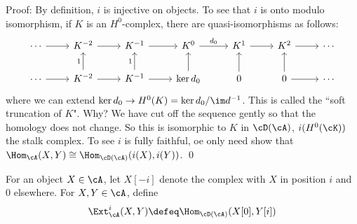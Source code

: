 \noindent Proof: By definition, $i$ is injective on objects. To see that $i$ is onto modulo isomorphism, if $K$ is an $H^0$-complex, there are quasi-isomorphisms as follows:
\[
\begin{tikzcd}
\cdots \arrow{r} & K^{-2} \arrow{r} & K^{-1} \arrow{r} & K^0 \arrow{r}{d_0} & K^1 \arrow{r} & K^2 \arrow{r} & \cdots \\
\cdots \arrow{r} & K^{-2} \arrow{r} \arrow{u}{1} & K^{-1} \arrow{r} \arrow{u}{1} & \ker d_0 \arrow{u} & 0 \arrow{u} & 0 \arrow{r} \arrow{u} & \cdots 
\end{tikzcd}
\]
where we can extend $\ker d_0 \to H^0(K)=\ker d_0/\im d^{-1}$. This is called the ``soft truncation of $K$". Why? We have cut off the sequence gently so that the homology does not change. So this is isomorphic to $K$ in $\cD(\cA)$, $i(H^0(\cK))$ the stalk complex. To see $i$ is fully faithful, oe only need show that $\Hom_{\cA}(X,Y) \cong \Hom_{\cD(\cA)}(i(X),i(Y))$. \qed \\

\begin{dfn}[Ext]
For an object $X \in \cA$, let $X[-i]$ denote the complex with $X$ in position $i$ and 0 elsewhere. For $X,Y \in \cA$, define
\[
\Ext_{\cA}^i(X,Y) \defeq \Hom_{\cD(\cA)}(X[0],Y[i])
\]
\end{dfn}

